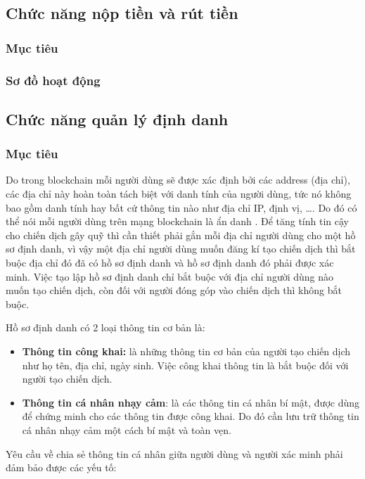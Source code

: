\documentclass[../main-report.tex]{subfiles}
\begin{document}
\subsection{Chức năng nộp tiền và rút tiền}
\subsubsection{Mục tiêu}

\subsubsection{Sơ đồ hoạt động}

\subsection{Chức năng quản lý định danh}
\subsubsection{Mục tiêu}
Do trong \gls{blockchain} mỗi người dùng sẽ được xác định bởi các \gls{address} (địa chỉ), các địa chỉ này hoàn toàn tách biệt với danh tính của người dùng, tức nó không bao gồm danh tính hay bất cứ thông tin nào như địa chỉ IP, định vị, \ldots. Do đó có thể nói mỗi người dùng trên mạng \gls{blockchain} là ẩn danh \cite{henry2018blockchain}. Để tăng tính tin cậy cho chiến dịch gây quỹ thì cần thiết phải gắn mỗi địa chỉ người dùng cho một hồ sơ định danh, vì vậy một địa chỉ người dùng muốn đăng kí tạo chiến dịch thì bắt buộc địa chỉ đó đã có hồ sơ định danh và hồ sơ định danh đó phải được xác minh. Việc tạo lập hồ sơ định danh chỉ bắt buộc với địa chỉ người dùng nào muốn tạo chiến dịch, còn đối với người đóng góp vào chiến dịch thì không bắt buộc.

Hồ sơ định danh có 2 loại thông tin cơ bản là: 

\begin{itemize}
\item \textbf{Thông tin công khai:} là những thông tin cơ bản của người tạo chiến dịch như họ tên, địa chỉ, ngày sinh. Việc công khai thông tin là bắt buộc đối với người tạo chiến dịch.
\item \textbf{Thông tin cá nhân nhạy cảm}: là các thông tin cá nhân bí mật, được dùng để chứng minh cho các thông tin được công khai. Do đó cần lưu trữ thông tin cá nhân nhạy cảm một cách bí mật và toàn vẹn.
\end{itemize}

Yêu cầu về chia sẻ thông tin cá nhân giữa người dùng và người xác minh phải đảm bảo được các yếu tố:
\end{document}

